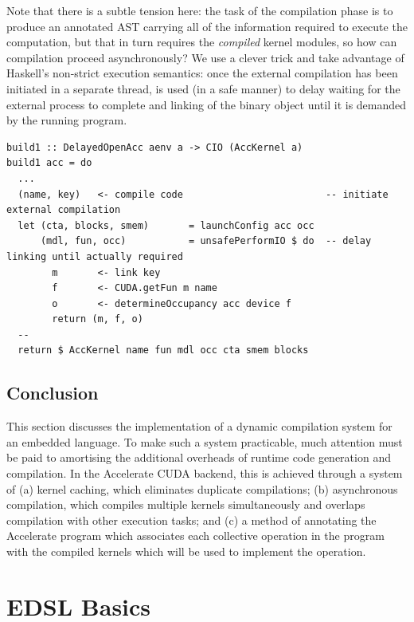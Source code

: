 Note that there is a subtle tension here: the task of the compilation phase is
to produce an annotated AST carrying all of the information required to execute
the computation, but that in turn requires the \emph{compiled} kernel modules,
so how can compilation proceed asynchronously? We use a clever trick and take
advantage of Haskell's non-strict execution semantics: once the external
compilation has been initiated in a separate thread,  is
used (in a safe manner) to delay waiting for the external process to complete
and linking of the binary object until it is demanded by the running program.
%
\begin{lstlisting}[style=haskell]
build1 :: DelayedOpenAcc aenv a -> CIO (AccKernel a)
build1 acc = do
  ...
  (name, key)   <- compile code                         -- initiate external compilation
  let (cta, blocks, smem)       = launchConfig acc occ
      (mdl, fun, occ)           = unsafePerformIO $ do  -- delay linking until actually required
        m       <- link key
        f       <- CUDA.getFun m name
        o       <- determineOccupancy acc device f
        return (m, f, o)
  --
  return $ AccKernel name fun mdl occ cta smem blocks
\end{lstlisting}


\subsection{Conclusion}

This section discusses the implementation of a dynamic compilation system for an
embedded language. To make such a system practicable, much attention must be
paid to amortising the additional overheads of runtime code generation and
compilation. In the Accelerate CUDA backend, this is achieved through a system
of (a) kernel caching, which eliminates duplicate compilations; (b) asynchronous
compilation, which compiles multiple kernels simultaneously and overlaps
compilation with other execution tasks; and (c) a method of annotating the
Accelerate program which associates each collective operation in the program
with the compiled kernels which will be used to implement the operation.


\section{EDSL Basics}


